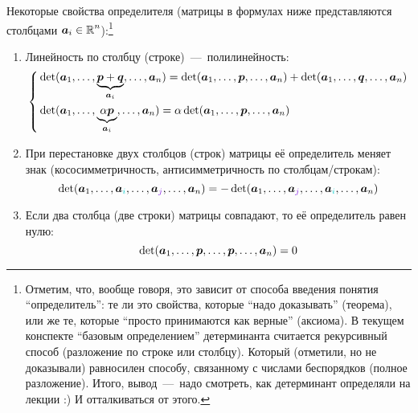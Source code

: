 \documentclass[a4paper,12pt]{article}
\theoremstyle{remark}
\begin{document}
  \begin{theorem}
    Некоторые свойства определителя (матрицы в формулах ниже представляются столбцами $\bds a_i \hm\in \RR^n$):\footnote{Отметим, что, вообще говоря, это зависит от способа введения понятия ``определитель'': те ли это свойства, которые ``надо доказывать'' (теорема), или же те, которые ``просто принимаются как верные'' (аксиома). В текущем конспекте ``базовым определением'' детерминанта считается рекурсивный способ (разложение по строке или столбцу). Который (отметили, но не доказывали) равносилен способу, связанному с числами беспорядков (полное разложение). Итого, вывод~---~надо смотреть, как детерминант определяли на лекции :) И отталкиваться от этого.}
    \begin{enumerate}
      \item Линейность по столбцу (строке)~---~полилинейность:
        \begin{equation}\label{eq:poly-linearity}
          \left\{
            \begin{aligned}
              &\det (\boldsymbol a_1, \ldots, \underbrace{\boldsymbol p + \boldsymbol q}_{\boldsymbol a_i}, \ldots, \boldsymbol a_n)
                = \det (\boldsymbol a_1, \ldots, \boldsymbol p, \ldots, \boldsymbol a_n)
                + \det (\boldsymbol a_1, \ldots, \boldsymbol q, \ldots, \boldsymbol a_n)\\
              &\det (\boldsymbol a_1, \ldots, \underbrace{\alpha \boldsymbol p}_{\boldsymbol a_i}, \ldots, \boldsymbol a_n)
                = \alpha \det (\boldsymbol a_1, \ldots, \boldsymbol p, \ldots, \boldsymbol a_n)
            \end{aligned}
          \right.
        \end{equation}
      \item При перестановке двух столбцов (строк) матрицы её определитель меняет знак (кососимметричность, антисимметричность по столбцам/строкам):
        \begin{equation}\label{eq:row-swap}
          \det (\bds a_1, \ldots, \bds a_{\textcolor{light-cyan}{i}}, \ldots, \bds a_{\textcolor{light-purple}{j}}, \ldots, \bds a_n)
          = -\det (\bds a_1, \ldots, \bds a_{\textcolor{light-purple}{j}}, \ldots, \bds a_{\textcolor{light-cyan}{i}}, \ldots, \bds a_n)
        \end{equation}
      \item Если два столбца (две строки) матрицы совпадают, то её определитель равен нулю:
        \begin{equation}\label{eq:same-rows}
          \det (\boldsymbol a_1, \ldots, \boldsymbol p, \ldots, \boldsymbol p, \ldots, \boldsymbol a_n) = 0
        \end{equation}
    \end{enumerate}
  \end{theorem}
  
\end{document}
